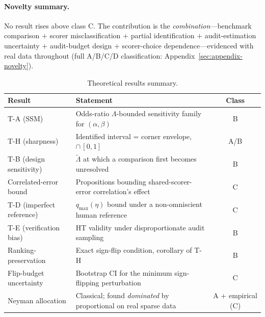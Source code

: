 \paragraph{Novelty summary.} No result rises above class C. The
contribution is the \emph{combination}---benchmark comparison $+$ scorer
misclassification $+$ partial identification $+$ audit-estimation
uncertainty $+$ audit-budget design $+$ scorer-choice
dependence---evidenced with real data throughout (full A/B/C/D
classification: Appendix~\ref{sec:appendix-novelty}).

\begin{table}[t]
  \centering
  \caption{Theoretical results summary.}
  \label{tab:theory-summary}
  \small
  \begin{tabular}{@{}p{3.1cm}p{7.3cm}c@{}}
    \toprule
    Result & Statement & Class \\
    \midrule
    T-A (SSM) & Odds-ratio $\Lambda$-bounded sensitivity family for $(\alpha,\beta)$ & B \\
    T-H (sharpness) & Identified interval = corner envelope, $\cap\,[0,1]$ & A/B \\
    T-B (design sensitivity) & $\tilde\Lambda$ at which a comparison first becomes unresolved & B \\
    Correlated-error bound & Propositions bounding shared-scorer-error correlation's effect & C \\
    T-D (imperfect reference) & $q_{\max}(\eta)$ bound under a non-omniscient human reference & C \\
    T-E (verification bias) & HT validity under disproportionate audit sampling & B \\
    Ranking-preservation & Exact sign-flip condition, corollary of T-H & B \\
    Flip-budget uncertainty & Bootstrap CI for the minimum sign-flipping perturbation & C \\
    Neyman allocation & Classical; found \emph{dominated} by proportional on real sparse data & A + empirical (C) \\
    \bottomrule
  \end{tabular}
\end{table}
